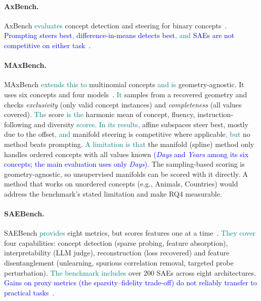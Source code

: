 \documentclass[11pt,a4paper]{article}
\newcommand{\todo}[1]{\textbf{\textcolor{red}{[TODO: #1]}}}
\newcommand{\fromextra}[1]{\textcolor{blue}{#1}}
\newcommand{\fromnotes}[1]{\textcolor{green!50!black}{#1}}
\newcommand{\fromclaude}[1]{\textcolor{orange!85!black}{#1}}
\newcommand{\fromprose}[1]{\textcolor{teal}{#1}}
\newcommand{\todo}[1]{\ifhmode\unskip\fi} %
\newcommand{\fromextra}[1]{#1}
\newcommand{\fromnotes}[1]{#1}
\newcommand{\fromclaude}[1]{#1}
\newcommand{\fromprose}[1]{#1}
\begin{document}
\paragraph{AxBench.}
AxBench \fromprose{evaluates} concept detection and steering for binary concepts~\cite{wu2025axbench}. \fromextra{Prompting steers best\fromprose{,} difference-in-means detects best\fromprose{, and} SAEs are not competitive on either task~\cite{wu2025axbench}.}

\paragraph{MAxBench.}
MAxBench \fromprose{extends this to} multinomial concepts \fromprose{and is} geometry-agnostic\fromclaude{. It uses six concepts and four models}~\cite{appapogu2026maxbench}.
\fromprose{It} samples from a recovered geometry and checks \emph{exclusivity} (only valid concept instances) and \emph{completeness} (all values covered)\fromprose{. The} score \fromprose{is the} harmonic mean of concept, fluency, instruction-following and diversity \fromprose{scores}.
\fromprose{In its results,} affine subspaces steer best, mostly due to the offset\fromprose{, and} manifold steering is competitive where applicable\fromprose{, but} no method beats prompting.
\fromprose{A limitation is that} the manifold (spline) method only handles ordered concepts \fromnotes{with all values known} \fromextra{(\emph{Days} and \emph{Years} among its six concepts; the main evaluation uses only \emph{Days})}.
\fromclaude{The sampling-based scoring is geometry-agnostic, so unsupervised manifolds can be scored with it directly. A method that works on unordered concepts (e.g., Animals, Countries) would address the benchmark's stated limitation and make RQ4 measurable.}

\paragraph{SAEBench.}
SAEBench \fromprose{provides} eight metrics, but scores features one at a time~\cite{karvonen2025saebench}. %
\fromprose{They cover} four capabilities: concept detection (sparse probing, feature absorption), interpretability (LLM judge), reconstruction (loss recovered) and feature disentanglement (unlearning, spurious correlation removal, targeted probe perturbation).
\fromprose{The benchmark includes} over 200 SAEs across eight architectures. \fromextra{Gains on proxy metrics (the sparsity--fidelity trade-off) do not reliably transfer to practical tasks~\cite{karvonen2025saebench}.}
\end{document}
